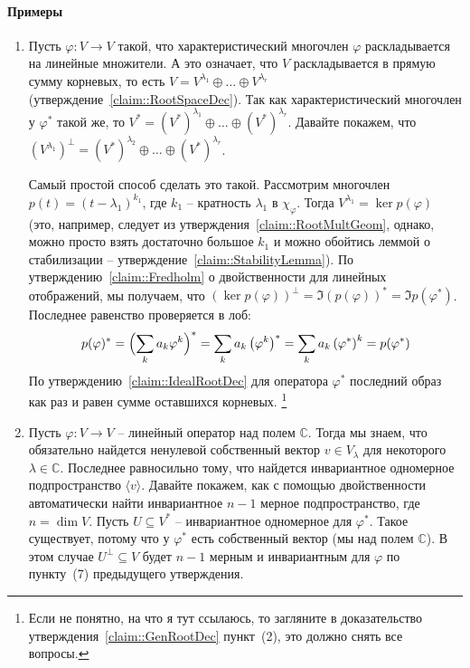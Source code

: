 \paragraph{Примеры}

\begin{enumerate}
\item Пусть $\varphi\colon V\to V$ такой, что характеристический многочлен $\varphi$ раскладывается на линейные множители.
А это означает, что $V$ раскладывается в прямую сумму корневых, то есть $V = V^{\lambda_1}\oplus \ldots \oplus V^{\lambda_r}$ (утверждение~\ref{claim::RootSpaceDec}).
Так как характеристический многочлен у $\varphi^*$ такой же, то $V^* = (V^*)^{\lambda_1}\oplus \ldots \oplus (V^*)^{\lambda_r}$.
Давайте покажем, что $(V^{\lambda_1})^\bot = (V^*)^{\lambda_2}\oplus \ldots \oplus (V^*)^{\lambda_r}$.

Самый простой способ сделать это такой.
Рассмотрим многочлен $p(t) = (t-\lambda_1)^{k_1}$, где $k_1$ -- кратность $\lambda_1$ в $\chi_\varphi$.
Тогда $V^{\lambda_1} = \ker p(\varphi)$ (это, например, следует из утверждения~\ref{claim::RootMultGeom}, однако, можно просто взять достаточно большое $k_1$ и можно обойтись леммой о стабилизации -- утверждение~\ref{claim::StabilityLemma}).
По утверждению~\ref{claim::Fredholm} о двойственности для линейных отображений, мы получаем, что $(\ker p(\varphi))^\bot = \Im (p(\varphi))^* = \Im p(\varphi^*)$.
Последнее равенство проверяется в лоб:
\[
p(\varphi)^* =  \Bigl(\sum_ka_k\varphi^k\Bigr)^* = \sum_ka_k \left(\varphi^k\right)^* = \sum_k a_k \left(\varphi^*\right)^k = p(\varphi^*)
\]
По утверждению~\ref{claim::IdealRootDec} для оператора $\varphi^*$ последний образ как раз и равен сумме оставшихся корневых.%
\footnote{Если не понятно, на что я тут ссылаюсь, то загляните в доказательство утверждения~\ref{claim::GenRootDec} пункт~(2), это должно снять все вопросы.}

\item Пусть $\varphi\colon V\to V$ -- линейный оператор над полем $\mathbb C$.
Тогда мы знаем, что обязательно найдется ненулевой собственный вектор $v\in V_\lambda$ для некоторого $\lambda\in \mathbb C$.
Последнее равносильно тому, что найдется инвариантное одномерное подпространство $\langle v \rangle$.
Давайте покажем, как с помощью двойственности автоматически найти инвариантное $n - 1$ мерное подпространство, где $n = \dim V$.
Пусть $U\subseteq V^*$ -- инвариантное одномерное для $\varphi^*$.
Такое существует, потому что у $\varphi^*$ есть собственный вектор (мы над полем $\mathbb C$).
В этом случае $U^\bot\subseteq V$ будет $n-1$ мерным и инвариантным для $\varphi$ по пункту~(7) предыдущего утверждения.
\end{enumerate}

